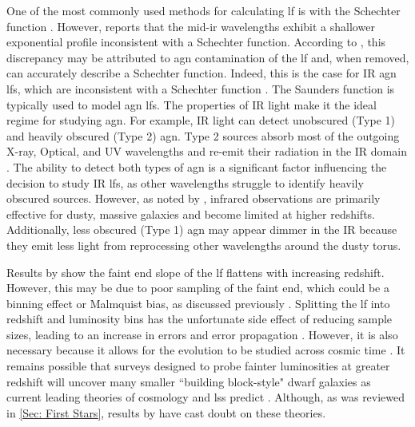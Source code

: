 One of the most commonly used methods for calculating \gls{lf} is with the Schechter function \citep{schechter_analytic_1976}. However, \cite{wu_mid-infrared_2011} reports that the mid-\gls{ir} wavelengths exhibit a shallower exponential profile inconsistent with a Schechter function. According to \cite{fu_decomposing_2010}, this discrepancy may be attributed to \gls{agn} contamination of the \gls{lf} and, when removed, can accurately describe a Schechter function. Indeed, this is the case for IR \gls{agn} \gls{lf}s, which are inconsistent with a Schechter function \citep{symeonidis_what_2019}. The Saunders function \citep{saunders_60-mum_1990} is typically used to model \gls{agn} \gls{lf}s. The properties of IR light make it the ideal regime for studying \gls{agn}. For example, IR light can detect unobscured (Type 1) and heavily obscured (Type 2) \gls{agn}. Type 2 sources absorb most of the outgoing X-ray, Optical, and UV wavelengths and re-emit their radiation in the IR domain \citep{fu_decomposing_2010, wu_mid-infrared_2011, gruppioni_modelling_2011, assef_mid-ir-_2011, toba_9_2013, oconnor_luminosity_2016, brown_infrared_2019, symeonidis_agn_2021}. The ability to detect both types of \gls{agn} is a significant factor influencing the decision to study IR \gls{lf}s, as other wavelengths struggle to identify heavily obscured sources. However, as noted by \cite{katsianis_evolution_2017}, infrared observations are primarily effective for dusty, massive galaxies and become limited at higher redshifts. Additionally, less obscured (Type 1) \gls{agn} may appear dimmer in the IR because they emit less light from reprocessing other wavelengths around the dusty torus. 

Results by \cite{han_evolution_2012} show the faint end slope of the \gls{lf} flattens with increasing redshift. However, this may be due to poor sampling of the faint end, which could be a binning effect or Malmquist bias, as discussed previously \citep{madau_cosmic_2014}. Splitting the \gls{lf} into redshift and luminosity bins has the unfortunate side effect of reducing sample sizes, leading to an increase in errors and error propagation \citep{dai_mid-infrared_2009}. However, it is also necessary because it allows for the evolution to be studied across cosmic time \citep{wu_mid-infrared_2011, wylezalek_galaxy_2014}. It remains possible that surveys designed to probe fainter luminosities at greater redshift will uncover many smaller ``building block-style" dwarf galaxies as current leading theories of cosmology and \gls{lss} predict \citep{magorrian_demography_1998, ziparo_primordial_2024}. Although, as was reviewed in \cref{Sec: First Stars}, results by \cite{labbe_population_2023} have cast doubt on these theories.

